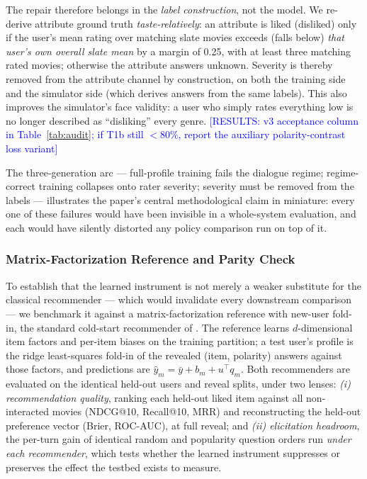 \documentclass[11pt]{article}
\newcommand{\results}[1]{\textcolor{blue}{[RESULTS: #1]}}
\begin{document}
The repair therefore belongs in the \emph{label construction}, not the
model. We re-derive attribute ground truth \emph{taste-relatively}: an
attribute is \textsf{liked} (\textsf{disliked}) only if the user's mean
rating over matching slate movies exceeds (falls below) \emph{that user's
own overall slate mean} by a margin of 0.25, with at least three matching
rated movies; otherwise the attribute answers \textsf{unknown}. Severity
is thereby removed from the attribute channel by construction, on both
the training side and the simulator side (which derives answers from the
same labels). This also improves the simulator's face validity: a user
who simply rates everything low is no longer described as ``disliking''
every genre. \results{v3 acceptance column in Table~\ref{tab:audit}; if
T1b still $<$80\%, report the auxiliary polarity-contrast loss variant}

The three-generation arc --- full-profile training fails the dialogue
regime; regime-correct training collapses onto rater severity; severity
must be removed from the labels --- illustrates the paper's central
methodological claim in miniature: every one of these failures would have
been invisible in a whole-system evaluation, and each would have silently
distorted any policy comparison run on top of it.

\subsubsection{Matrix-Factorization Reference and Parity Check}
\label{sec:mf_reference}

To establish that the learned instrument is not merely a weaker substitute
for the classical recommender --- which would invalidate every downstream
comparison --- we benchmark it against a matrix-factorization reference
with new-user fold-in, the standard cold-start recommender of
\citet{golbandi2011adaptive, zhou2011functional}. The reference learns
$d$-dimensional item factors and per-item biases on the training partition;
a test user's profile is the ridge least-squares fold-in of the revealed
(item, polarity) answers against those factors, and predictions are
$\hat{y}_m = \bar{y} + b_m + u^\top q_m$. Both recommenders are evaluated on
the identical held-out users and reveal splits, under two lenses:
\emph{(i) recommendation quality}, ranking each held-out liked item against
all non-interacted movies (NDCG@10, Recall@10, MRR) and reconstructing the
held-out preference vector (Brier, ROC-AUC), at full reveal; and
\emph{(ii) elicitation headroom}, the per-turn gain of identical
random and popularity question orders run \emph{under each recommender},
which tests whether the learned instrument suppresses or preserves the
effect the testbed exists to measure.
\end{document}
